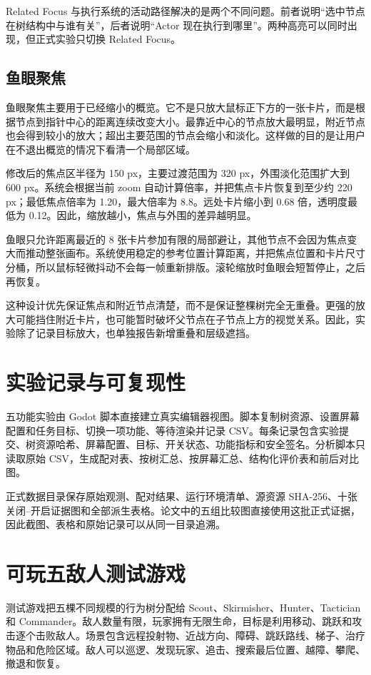 \documentclass[11pt,a4paper,oneside,extrafontsizes]{memoir}
\begin{document}
Related Focus 与执行系统的活动路径解决的是两个不同问题。前者说明“选中节点在树结构中与谁有关”，后者说明“Actor 现在执行到哪里”。两种高亮可以同时出现，但正式实验只切换 Related Focus。

\subsection{鱼眼聚焦}

鱼眼聚焦主要用于已经缩小的概览。它不是只放大鼠标正下方的一张卡片，而是根据节点到指针中心的距离连续改变大小。最靠近中心的节点放大最明显，附近节点也会得到较小的放大；超出主要范围的节点会缩小和淡化。这样做的目的是让用户在不退出概览的情况下看清一个局部区域。

修改后的焦点区半径为 150 px，主要过渡范围为 320 px，外围淡化范围扩大到 600 px。系统会根据当前 zoom 自动计算倍率，并把焦点卡片恢复到至少约 220 px；最低焦点倍率为 1.20，最大倍率为 8.8。远处卡片缩小到 0.68 倍，透明度最低为 0.12。因此，缩放越小，焦点与外围的差异越明显。

鱼眼只允许距离最近的 8 张卡片参加有限的局部避让，其他节点不会因为焦点变大而推动整张画布。系统使用稳定的参考位置计算距离，并把焦点位置和卡片尺寸分桶，所以鼠标轻微抖动不会每一帧重新排版。滚轮缩放时鱼眼会短暂停止，之后再恢复。

这种设计优先保证焦点和附近节点清楚，而不是保证整棵树完全无重叠。更强的放大可能挡住附近卡片，也可能暂时破坏父节点在子节点上方的视觉关系。因此，实验除了记录目标放大，也单独报告新增重叠和层级遮挡。

\section{实验记录与可复现性}

五功能实验由 Godot 脚本直接建立真实编辑器视图。脚本复制树资源、设置屏幕配置和任务目标、切换一项功能、等待渲染并记录 CSV。每条记录包含实验提交、树资源哈希、屏幕配置、目标、开关状态、功能指标和安全签名。分析脚本只读取原始 CSV，生成配对表、按树汇总、按屏幕汇总、结构化评价表和前后对比图。

正式数据目录保存原始观测、配对结果、运行环境清单、源资源 SHA-256、十张关闭–开启证据图和全部派生表格。论文中的五组比较图直接使用这批正式证据，因此截图、表格和原始记录可以从同一目录追溯。

\section{可玩五敌人测试游戏}

测试游戏把五棵不同规模的行为树分配给 Scout、Skirmisher、Hunter、Tactician 和 Commander。敌人数量有限，玩家拥有无限生命，目标是利用移动、跳跃和攻击逐个击败敌人。场景包含远程投射物、近战方向、障碍、跳跃路线、梯子、治疗物品和危险区域。敌人可以巡逻、发现玩家、追击、搜索最后位置、越障、攀爬、撤退和恢复。
\end{document}
